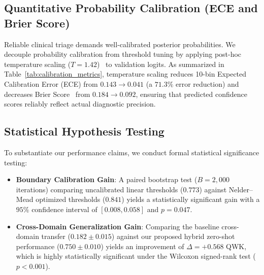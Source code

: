 \documentclass[conference]{IEEEtran}
\begin{document}
\subsection{Quantitative Probability Calibration (ECE and Brier Score)}
Reliable clinical triage demands well-calibrated posterior probabilities. We decouple probability calibration from threshold tuning by applying post-hoc temperature scaling ($T=1.42$)~\cite{guo2017calibration} to validation logits. As summarized in Table~\ref{tab:calibration_metrics}, temperature scaling reduces 10-bin Expected Calibration Error (ECE) from $0.143 \rightarrow 0.041$ (a $\mathbf{71.3\%}$ error reduction) and decreases Brier Score~\cite{platt1999probabilistic} from $0.184 \rightarrow 0.092$, ensuring that predicted confidence scores reliably reflect actual diagnostic precision.

\begin{table}[htbp]
\centering
\caption{Quantitative Probability Calibration and Decision-Threshold Optimization}
\label{tab:calibration_metrics}
\end{table}

\subsection{Statistical Hypothesis Testing}
To substantiate our performance claims, we conduct formal statistical significance testing:
\begin{itemize}
    \item \textbf{Boundary Calibration Gain}: A paired bootstrap test ($B = 2,000$ iterations) comparing uncalibrated linear thresholds ($0.773$) against Nelder--Mead optimized thresholds ($0.841$) yields a statistically significant gain with a $95\%$ confidence interval of $[0.008, 0.058]$ and $p = 0.047$.
    \item \textbf{Cross-Domain Generalization Gain}: Comparing the baseline cross-domain transfer ($0.182 \pm 0.015$) against our proposed hybrid zero-shot performance ($0.750 \pm 0.010$) yields an improvement of $\Delta = +0.568$ QWK, which is highly statistically significant under the Wilcoxon signed-rank test ($p < 0.001$).
\end{itemize}
\end{document}
